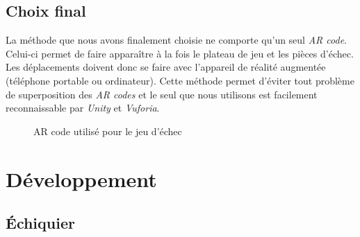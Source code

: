 \documentclass{article}
\begin{document}
\subsection{Choix final}
La méthode que nous avons finalement choisie ne comporte qu'un seul \textit{AR code}. Celui-ci permet de faire apparaître à la fois le plateau de jeu et les pièces d'échec. Les déplacements doivent donc se faire avec l'appareil de réalité augmentée (téléphone portable ou ordinateur). Cette méthode permet d'éviter tout problème de superposition des \textit{AR codes} et le seul que nous utilisons est facilement reconnaissable par \textit{Unity} et \textit{Vuforia}.
\begin{center}
    \begin{figure}[H]
        \caption{AR code utilisé pour le jeu d'échec}
    \end{figure}
\end{center}
\newpage
\section{Développement}
\subsection{Échiquier}
\end{document}
